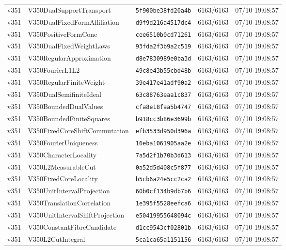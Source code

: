 \documentclass[11pt]{article}
\theoremstyle{definition}\newtheorem{deriv}{Derivação}
\begin{document}
{\begin{longtable}{@{}lllll@{}}
v351 & V350DualSupportTransport & \texttt{5f900be38fd20a4b} & 6163/6163 & 07/10 19:08:57 \\
v351 & V350DualFixedFormAffiliation & \texttt{d9f9d216a4517dc4} & 6163/6163 & 07/10 19:08:57 \\
v351 & V350PositiveFormCone & \texttt{cee6510b0cd71261} & 6163/6163 & 07/10 19:08:57 \\
v351 & V350DualFixedWeightLaws & \texttt{93fda2f3b9a2c519} & 6163/6163 & 07/10 19:08:57 \\
v351 & V350RegularApproximation & \texttt{d8e7830989e0ba3d} & 6163/6163 & 07/10 19:08:57 \\
v351 & V350FourierL1L2 & \texttt{49c8e43b55cbd48b} & 6163/6163 & 07/10 19:08:57 \\
v351 & V350RegularFiniteWeight & \texttt{39e417e41adf90a2} & 6163/6163 & 07/10 19:08:57 \\
v351 & V350DualSemifiniteIdeal & \texttt{63c88763eaa1c837} & 6163/6163 & 07/10 19:08:57 \\
v351 & V350BoundedDualValues & \texttt{cfa8e18faa5b4747} & 6163/6163 & 07/10 19:08:57 \\
v351 & V350BoundedFiniteSquares & \texttt{b918cc3b86e3699b} & 6163/6163 & 07/10 19:08:57 \\
v351 & V350FixedCoreShiftCommutation & \texttt{efb3533d950d396a} & 6163/6163 & 07/10 19:08:57 \\
v351 & V350FourierUniqueness & \texttt{16eba1061905aa2e} & 6163/6163 & 07/10 19:08:57 \\
v351 & V350CharacterLocality & \texttt{7a5d2f1b70b3d613} & 6163/6163 & 07/10 19:08:57 \\
v351 & V350L2MeasurableCut & \texttt{0a52d5d408c5f877} & 6163/6163 & 07/10 19:08:57 \\
v351 & V350FixedCoreLocality & \texttt{b5cb6a24e5cc2ca2} & 6163/6163 & 07/10 19:08:57 \\
v351 & V350UnitIntervalProjection & \texttt{60b0cf134b9db7b6} & 6163/6163 & 07/10 19:08:57 \\
v351 & V350TranslationCorrelation & \texttt{1e395f5528eefca6} & 6163/6163 & 07/10 19:08:57 \\
v351 & V350UnitIntervalShiftProjection & \texttt{e50419955648094c} & 6163/6163 & 07/10 19:08:57 \\
v351 & V350ConstantFibreCandidate & \texttt{d1cc9543cf02801b} & 6163/6163 & 07/10 19:08:57 \\
v351 & V350L2CutIntegral & \texttt{5ca1ca65a1151156} & 6163/6163 & 07/10 19:08:57 \\

\end{longtable}}
\end{document}
